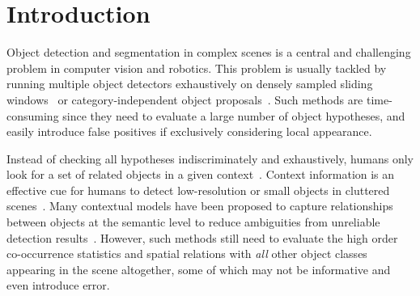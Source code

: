 \section{Introduction}

Object detection and segmentation in complex scenes is a central and challenging problem in computer vision and robotics.
This problem is usually tackled by running multiple object detectors exhaustively on densely sampled sliding windows~\cite{felzenszwalb2010object} or category-independent object proposals~\cite{carreira2012cpmc,van2011segmentation,arbelaez2014multiscale}. 
Such methods are time-consuming since they need to evaluate a large number of object hypotheses, and easily introduce false positives if exclusively considering local appearance.

Instead of checking all hypotheses indiscriminately and exhaustively, humans only look for a set of related objects in a given context~\cite{biederman1982scene, hock1974contextual}. Context information is an effective cue for humans to detect low-resolution or small objects in cluttered scenes~\cite{parikh2012exploring}. Many contextual models have been proposed to capture relationships between objects at the semantic level to reduce ambiguities from unreliable detection results~\cite{gould2009decomposing, galleguillos2010context, ladicky2010graph}. %
However, such methods still need to evaluate the high order co-occurrence statistics and spatial relations with \emph{all} other object classes appearing in the scene altogether, some of which may not be informative and even introduce error.  


